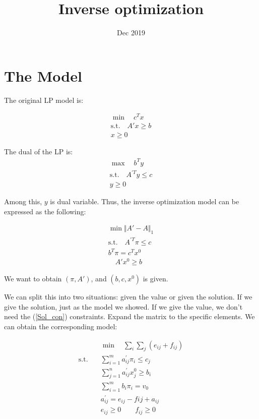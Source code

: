 \documentclass[UTF8]{article}
\title{Inverse optimization}
\date{Dec 2019}
\numberwithin{equation}{section}
\begin{document}
\maketitle{}

\section{The Model}

The original LP model is:

\begin{equation}
\begin{align*}
  \min \quad c^Tx \\
\text{s.t.} \quad A'x \geq b  \\
x \geq 0
\end{align*}
\end{equation}

The dual of the LP is:
\begin{equation}
\begin{align*}
  \max \quad b^Ty \\
\text{s.t.} \quad A^{'T}y \leq c  \\
y \geq 0
\end{align*}
\end{equation}

Among this, $y$ is dual variable.
Thus, the inverse optimization model can be expressed as the following:

\begin{align}
  \min \Vert A'-A \Vert_1 \nonumber \\
\mathrm{s.t.}  \quad A^{'T} \pi \leq c  \\
  b^T \pi = c^Tx^0  \\
  \quad A'x^0 \geq b \label{Sol_con}
\end{align}

We want to obtain $(\pi,A')$, and $(b,c,x^0)$ is given.

We can split this into two situations: given the value or given the solution. If we give the solution, just as the model we showed. If we give the value, we don't need the (\ref{Sol_con}) constraints.
Expand the matrix to the specific elements. We can obtain the corresponding model:

\begin{equation}
\begin{align*}
& \min \quad \sum_i \sum_j (e_{ij}+f_{ij})\\
\mathrm{s.t.} \quad &\sum_{i=1}^m a^{'}_{ij} \pi_i \leq c_j \\
&\sum_{j=1}^n a^{'}_{ij} x_j^0 \geq b_i \\
&\sum_{i=1}^m b_i \pi_i = v_0 \\
&a^{'}_{ij} = e_{ij}-f{ij}+a_{ij} \\
&e_{ij} \geq 0 \qquad f_{ij} \geq 0
\end{align*}
\end{equation}
\end{document}
